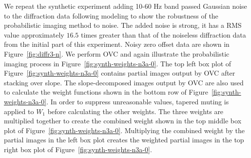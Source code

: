 
We repeat the synthetic experiment adding 10-60 Hz band passed Gaussian noise to the diffraction data following modeling to show the robustness of the probabilistic imaging method to noise. The added noise is strong, it has a RMS value approximately $16.5$ times greater than  that of the noiseless diffraction data from the initial part of this experiment.  Noisy zero offset data are shown in Figure~\ref{fig:diffr3-n}. We perform OVC and again illustrate the probabilistic imaging process in  Figure~\ref{fig:synth-weights-n3a-0}.  The top left box plot of Figure~\ref{fig:synth-weights-n3a-0} contains partial images output by OVC after stacking over slope. The slope-decomposed images output by OVC are also used to calculate the weight functions shown in the bottom row of Figure~\ref{fig:synth-weights-n3a-0}.  In order to suppress unreasonable values, tapered muting is applied to $W_1$ before calculating the other weights. The three weights are multiplied together to create the combined weight shown in the top middle box plot of Figure~\ref{fig:synth-weights-n3a-0}.  Multiplying the combined weight by the partial images in the left box plot creates the weighted partial images in the top right box plot of Figure~\ref{fig:synth-weights-n3a-0}.  





